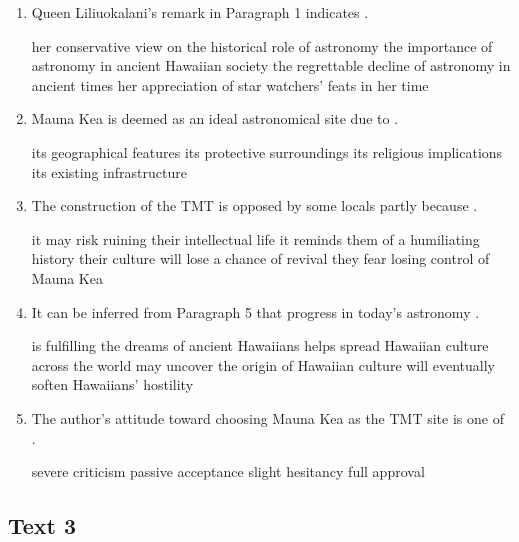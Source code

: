 \begin{enumerate}[resume]
	\item
Queen Liliuokalani's remark in Paragraph 1 indicates \lineread.


\fourchoices
{her conservative view on the historical role of astronomy}
{the importance of astronomy in ancient Hawaiian society}
{the regrettable decline of astronomy in ancient times}
{her appreciation of star watchers' feats in her time}




\item
Mauna Kea is deemed as an ideal astronomical site due to \lineread.


\fourchoices
{its geographical features}
{its protective surroundings}
{its religious implications}
{its existing infrastructure}


\item
The construction of the TMT is opposed by some locals partly because \lineread.


\fourchoices
{it may risk ruining their intellectual life}
{it reminds them of a humiliating history}
{their culture will lose a chance of revival}
{they fear losing control of Mauna Kea}




\item
It can be inferred from Paragraph 5 that progress in today's
astronomy \lineread.

\fourchoices
{is fulfilling the dreams of ancient Hawaiians}
{helps spread Hawaiian culture across the world}
{may uncover the origin of Hawaiian culture}
{will eventually soften Hawaiians' hostility}


\item
The author's attitude toward choosing Mauna Kea as the TMT site is
one of \lineread.


\fourchoices
{severe criticism}
{passive acceptance}
{slight hesitancy}
{full approval}



\end{enumerate}


\newpage
\subsection{Text 3}


